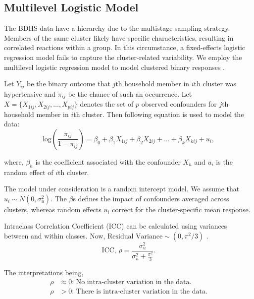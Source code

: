 \documentclass[
  12pt,
  a4paper]{article}
\begin{document}
\subsection{Multilevel Logistic Model}\label{multilevel-logistic-model}

The BDHS data have a hierarchy due to the multistage sampling strategy. Members of the same cluster likely have specific characteristics, resulting in correlated reactions within a group. In this circumstance, a fixed-effects logistic regression model fails to capture the cluster-related variability. We employ the multilevel logistic regression model to model clustered binary responses \citep{liu2006mixed}.

Let \(Y_{ij}\) be the binary outcome that \(j\)th household member in \(i\)th cluster was hypertensive and \(\pi_{ij}\) be the chance of such an occurrence. Let \(X=\{X_{1ij}, X_{2ij},\ldots, X_{pij}\}\) denotes the set of \(p\) observed confounders for \(j\)th household member in \(i\)th cluster. Then following equation is used to model the data:
\[\text{log}\left(\frac{\pi_{ij}}{1-\pi_{ij}}\right)=\beta_0+\beta_{1} X_{1ij}+ \beta_{2} X_{2ij} +\ldots+\beta_{k} X_{kij}+u_i,\]

\noindent
where, \(\beta_h\) is the coefficient associated with the confounder \(X_h\) and \(u_i\) is the random effect of \(i\)th cluster.

The model under consideration is a random intercept model. We assume that \(u_i \sim N(0,\sigma_u^2)\). The \(\beta\)s defines the impact of confounders averaged across clusters, whereas random effects \(u_i\) correct for the cluster-specific mean response.

Intraclass Correlation Coefficient (ICC) can be calculated using variances between and within classes. Now, \(\text{Residual Variance} \sim (0,\pi^2/3)\) \citep{powers2008statistical}.
\[\text{ICC,  }\rho=\frac{\sigma^2_u} {\sigma^2_u+\frac{\pi^2}{3}}. \tag{3.2}\]

The interpretations being,
\[\begin{aligned} \rho &\approx 0 \text{: No intra-cluster variation in the data. } \\
\rho &> 0 \text{: There is intra-cluster variation in the data.} \end{aligned}\]
\end{document}
